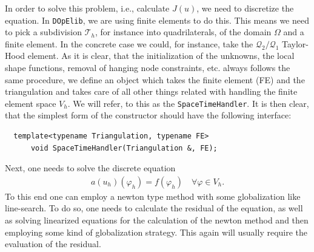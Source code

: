 \documentclass[prodmode,acmtoms]{acmsmall}
\numberwithin{equation}{section}
\renewcommand{\phi}{\varphi}
\newcommand{\dope}{\texttt{DOpElib}}
\begin{document}
In order to solve this problem, i.e., calculate $J(u)$, we need to discretize 
the equation. In \dope, we are using finite elements to do this. This means we need to pick a 
subdivision $\mathcal T_h$, for instance into quadrilaterals,
of the domain $\Omega$ and a finite element. In the concrete case we could, 
for instance, take the $\mathcal Q_2/\mathcal Q_1$ Taylor-Hood element.
As it is clear, that the initialization of the unknowns, the local shape 
functions, removal of hanging node constraints, etc. always follows the 
same procedure, we define an object which takes the finite element (FE)
and the triangulation and takes care of all other things related with 
handling the finite element space $V_h$. We will refer, to 
this as the \texttt{SpaceTimeHandler}. It is then clear, that the simplest 
form of the constructor should have the following interface:
\begin{lstlisting}
  template<typename Triangulation, typename FE>
      void SpaceTimeHandler(Triangulation &, FE);
\end{lstlisting}
Next, one needs to solve the discrete equation
\begin{align}\label{eq:discrete_equation}
a(u_h)(\phi_h) = f(\phi_h) \quad \forall \phi \in V_h.
\end{align}
To this end one can employ a newton type method with some globalization 
like line-search. To do so, one needs to calculate the residual of the 
equation, as well as solving linearized equations for the calculation of 
the newton method and then employing some kind of globalization strategy.
This again will usually require the evaluation of the residual.
\end{document}
